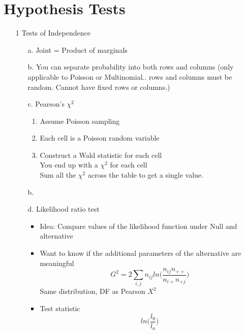 \documentclass[12 pt]{article}
\begin{document}
\section{Hypothesis Tests} 
\begin{itemize} 
    \item[1] Tests of Independence
        \begin{itemize}
        \item [a.] Joint = Product of marginals
        \item [b.] You can separate probability into both rows and columns (only applicable to Poisson or Multinomial.. rows and columns must be random. Cannot have fixed rows or columns.)
        \item [c.] Pearson's \( \chi ^2\) 
            \begin{enumerate}
                \item Assume Poisson sampling
                \item Each cell is a Poisson random variable
                \item Construct a Wald statistic for each cell\\
                    You end up with a \(\chi ^2\) for each cell \\
                    Sum all the \( \chi ^2 \) across the table to get a single value. 
            \end{enumerate}
        \item [b.]
        \item [d.] Likelihood ratio test
            \begin{itemize}
                \item Idea: Compare values of the likelihood function under Null and alternative
                \item Want to know if the additional parameters of the alternative are meaningful
                $$ G^2=2 \sum_{i,j} n_{ij} ln \Big( \frac{n_{ij}n_{++}}{n_{i+}n_{+j}} \Big) $$
                Same distribution, DF as Pearson \(X^2\)
                \item Test statistic
                $$ ln \Big( \frac{l_0}{l_a} \Big) $$
            \end{itemize} 
        

\end{itemize}
\end{itemize}
\end{document}
